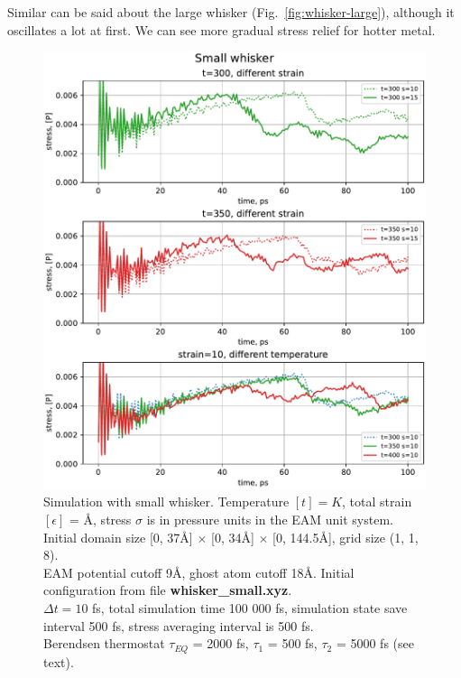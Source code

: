 \documentclass[12pt,a4paper]{article}
\begin{document}
Similar can be said about the large whisker (Fig.~\ref{fig:whisker-large}), although it oscillates a lot at first. We can see more gradual stress relief for hotter metal.


\begin{figure}[h!]
	\centering
	\includegraphics[width=.95\linewidth]{img/milestone09-small.pdf}
	\caption{Simulation with small whisker. Temperature $[t]=K$, total strain $[\epsilon]$ = Å, stress $\sigma$ is in pressure units in the EAM unit system.\\
	Initial domain size [0, 37Å] $\times$ [0, 34Å] $\times$ [0, 144.5Å], grid size (1, 1, 8).\\
	EAM potential cutoff 9Å, ghost atom cutoff 18Å. Initial configuration from file {\bf whisker\_small.xyz}.\\
	$\Delta t = 10$ fs, total simulation time 100 000 fs, simulation state save interval 500 fs, stress averaging interval is 500 fs.\\
	Berendsen thermostat $\tau_{EQ}$ = 2000 fs, $\tau_1$ = 500 fs, $\tau_2$ = 5000 fs (see text).
	}
	\label{fig:whisker-small}
\end{figure}
\end{document}
